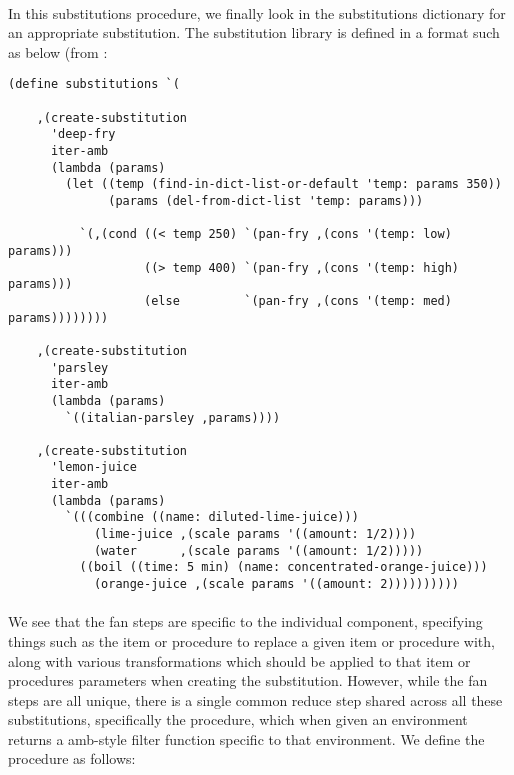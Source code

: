 \paragraph{}
In this substitutions procedure, we finally look in the substitutions dictionary for an appropriate substitution. The substitution library is defined in a format such as below (from :
\begin{verbatim}
(define substitutions `(

    ,(create-substitution
      'deep-fry
      iter-amb
      (lambda (params)
        (let ((temp (find-in-dict-list-or-default 'temp: params 350))
              (params (del-from-dict-list 'temp: params)))

          `(,(cond ((< temp 250) `(pan-fry ,(cons '(temp: low) params)))
                   ((> temp 400) `(pan-fry ,(cons '(temp: high) params)))
                   (else         `(pan-fry ,(cons '(temp: med) params))))))))

    ,(create-substitution
      'parsley
      iter-amb
      (lambda (params)
        `((italian-parsley ,params))))

    ,(create-substitution
      'lemon-juice
      iter-amb
      (lambda (params)
        `(((combine ((name: diluted-lime-juice)))
            (lime-juice ,(scale params '((amount: 1/2))))
            (water      ,(scale params '((amount: 1/2)))))
          ((boil ((time: 5 min) (name: concentrated-orange-juice)))
            (orange-juice ,(scale params '((amount: 2))))))))))

\end{verbatim}

\paragraph{}
We see that the fan steps are specific to the individual component, specifying things such as the item or procedure to replace a given item or procedure with, along with various transformations which should be applied to that item or procedures parameters when creating the substitution. However, while the fan steps are all unique, there is a single common reduce step shared across all these substitutions, specifically the  procedure, which when given an environment returns a amb-style filter function specific to that environment. We define the  procedure as follows:

